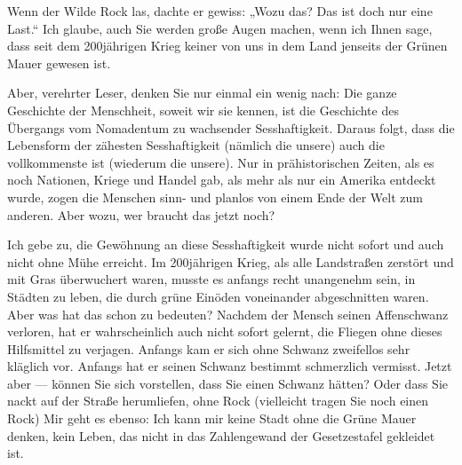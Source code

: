 Wenn der Wilde Rock las, dachte er gewiss: „Wozu das? Das ist doch
nur eine Last.“ Ich glaube, auch Sie werden große Augen machen,
wenn ich Ihnen sage, dass seit dem 200jährigen Krieg keiner von uns
in dem Land jenseits der Grünen Mauer gewesen ist.

Aber, verehrter Leser, denken Sie nur einmal ein wenig nach: Die
ganze Geschichte der Menschheit, soweit wir sie kennen, ist die
Geschichte des Übergangs vom Nomadentum zu wachsender
Sesshaftigkeit. Daraus folgt, dass die Lebensform der zähesten
Sesshaftigkeit (nämlich die unsere) auch die vollkommenste ist
(wiederum die unsere). Nur in prähistorischen Zeiten, als es noch
Nationen, Kriege und Handel gab, als mehr als nur ein Amerika
entdeckt wurde, zogen die Menschen sinn- und planlos von einem Ende
der Welt zum anderen. Aber wozu, wer braucht das jetzt noch?

Ich gebe zu, die Gewöhnung an diese Sesshaftigkeit wurde nicht
sofort und auch nicht ohne Mühe erreicht. Im 200jährigen Krieg, als
alle Landstraßen zerstört und mit Gras überwuchert waren, musste es
anfangs recht unangenehm sein, in Städten zu leben, die durch grüne
Einöden voneinander abgeschnitten waren. Aber was hat das schon zu
bedeuten? Nachdem der Mensch seinen Affenschwanz verloren, hat er
wahrscheinlich auch nicht sofort gelernt, die Fliegen ohne dieses
Hilfsmittel zu verjagen. Anfangs kam er sich ohne Schwanz
zweifellos sehr kläglich vor. Anfangs hat er seinen Schwanz
bestimmt schmerzlich vermisst. Jetzt aber — können Sie sich
vorstellen, dass Sie einen Schwanz hätten? Oder dass Sie nackt auf
der Straße herumliefen, ohne Rock (vielleicht
tragen Sie noch einen Rock) Mir geht es ebenso: Ich kann mir
keine Stadt ohne die Grüne Mauer denken, kein Leben, das nicht in
das Zahlengewand der Gesetzestafel gekleidet ist.

